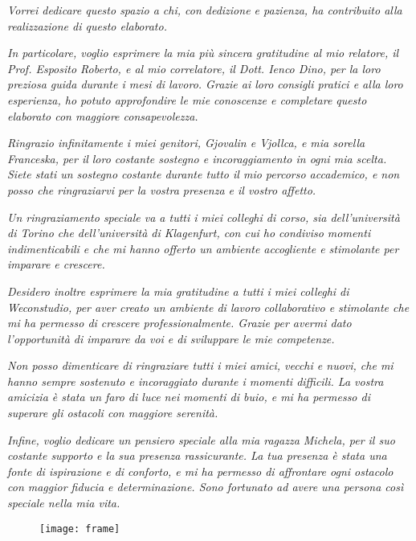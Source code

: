 \thispagestyle{empty}
\vspace*{\fill}

\textit{Vorrei dedicare questo spazio a chi, con dedizione e pazienza, ha contribuito alla realizzazione di questo elaborato.} 

\textit{In particolare, voglio esprimere la mia più sincera gratitudine al mio relatore, il Prof. Esposito Roberto, e al mio correlatore, il Dott. Ienco Dino, per la loro preziosa guida durante i mesi di lavoro. Grazie ai loro consigli pratici e alla loro esperienza, ho potuto approfondire le mie conoscenze e completare questo elaborato con maggiore consapevolezza.}

\textit{Ringrazio infinitamente i miei genitori, \emph{Gjovalin} e Vjollca, e mia sorella\\ Franceska, per il loro costante sostegno e incoraggiamento in ogni mia scelta. Siete stati un sostegno costante durante tutto il mio percorso accademico, e non posso che ringraziarvi per la vostra presenza e il vostro affetto.}

\textit{Un ringraziamento speciale va a tutti i miei colleghi di corso, sia dell'università di Torino che dell'università di Klagenfurt, con cui ho condiviso momenti indimenticabili e che mi hanno offerto un ambiente accogliente e stimolante per imparare e crescere.}

\textit{Desidero inoltre esprimere la mia gratitudine a tutti i miei colleghi di Weconstudio, per aver creato un ambiente di lavoro collaborativo e stimolante che mi ha permesso di crescere professionalmente. Grazie per avermi dato l'opportunità di imparare da voi e di sviluppare le mie competenze.}

\textit{Non posso dimenticare di ringraziare tutti i miei amici, vecchi e nuovi, che mi hanno sempre sostenuto e incoraggiato durante i momenti difficili. La vostra amicizia è stata un faro di luce nei momenti di buio, e mi ha permesso di superare gli ostacoli con maggiore serenità.} 

\textit{Infine, voglio dedicare un pensiero speciale alla mia ragazza Michela, per il suo costante supporto e la sua presenza rassicurante. La tua presenza è stata una fonte di ispirazione e di conforto, e mi ha permesso di affrontare ogni ostacolo con maggior fiducia e determinazione. Sono fortunato ad avere una persona così speciale nella mia vita.}

\vspace*{\fill}

\begin{flushright}
  \begin{figure}[H]
    \texttt{[image: frame]}
  \end{figure}
\end{flushright}